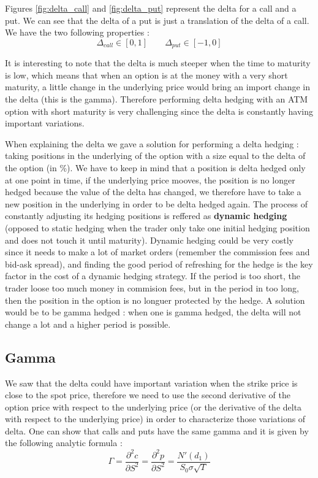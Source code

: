 \documentclass[hidelinks]{article}
\begin{document}
Figures \ref{fig:delta_call} and \ref{fig:delta_put} represent the delta for a call and a put. We can see that the delta of a put is just a translation of the delta of a call. We have the two following properties :
$$ \Delta_{call} \in [0,1] \quad \quad \Delta_{put} \in [-1,0]$$

It is interesting to note that the delta is much steeper when the time to maturity is low, which means that when an option is at the money with a very short maturity, a little change in the underlying price would bring an import change in the delta (this is the gamma). Therefore performing delta hedging with an ATM option with short maturity is very challenging since the delta is constantly having important variations.

When explaining the delta we gave a solution for performing a delta hedging : taking positions in the underlying of the option with a size equal to the delta of the option (in \%). We have to keep in mind that a position is delta hedged only at one point in time, if the underlying price mooves, the position is no longer hedged because the value of the delta has changed, we therefore have to take a new position in the underlying in order to be delta hedged again. The process of constantly adjusting its hedging positions is reffered as \textbf{dynamic hedging} (opposed to static hedging when the trader only take one initial hedging position and does not touch it until maturity). Dynamic hedging could be very costly since it needs to make a lot of market orders (remember the commission fees and bid-ask spread), and finding the good period of refreshing for the hedge is the key factor in the cost of a dynamic hedging strategy. If the period is too short, the trader loose too much money in commision fees, but in the period in too long, then the position in the option is no longuer protected by the hedge. A solution would be to be gamma hedged : when one is gamma hedged, the delta will not change a lot and a higher period is possible.
\newpage
\subsection{Gamma}

	We saw that the delta could have important variation when the strike price is close to the spot price, therefore we need to use the second derivative of the option price with respect to the underlying price (or the derivative of the delta with respect to the underlying price) in order to characterize those variations of delta. One can show that calls and puts have the same gamma and it is given by the following analytic formula :
	$$ \Gamma= \frac{\partial^2 c}{\partial S^2} =\frac{\partial^2 p}{\partial S^2} = \frac{N'(d_1)}{S_0 \sigma \sqrt{T}}$$
	
\end{document}
